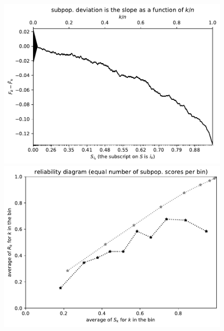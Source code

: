 \documentclass{article}
\begin{document}
\begin{figure}
\begin{centering}

\parbox{\imsize}{\includegraphics[width=\imsize]
{./codes/unweighted/prob-1-60-night-snake-Hypsiglena-torquata}}
\quad\quad
\parbox{\imsize}{\includegraphics[width=\imsize]
{./codes/unweighted/prob-1-60-night-snake-Hypsiglena-torquataequisamps10}}

\vspace{\vertsep}


\end{centering}
\end{figure}
\end{document}
